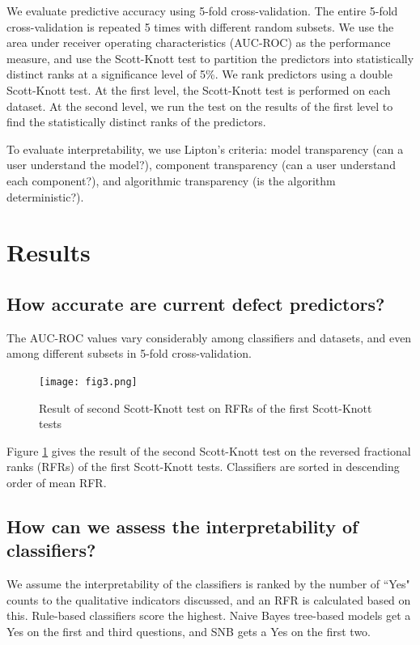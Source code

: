 \documentclass[sigconf]{acmart}
\begin{document}
We evaluate predictive accuracy using 5-fold cross-validation. The entire 5-fold cross-validation is repeated 5 times with different random subsets. We use the area under receiver operating characteristics (AUC-ROC) as the performance measure, and use the Scott-Knott test \cite{jelihovschi2014scottknott} to partition the predictors into statistically distinct ranks at a significance level of 5\%. We rank predictors using a double Scott-Knott test. At the first level, the Scott-Knott test is performed on each dataset. At the second level, we run the test on the results of the first level to find the statistically distinct ranks of the predictors.

To evaluate interpretability, we use Lipton's criteria: model transparency (can a user understand the model?), component transparency (can a user understand each component?), and algorithmic transparency (is the algorithm deterministic?).

\section{Results}

\subsection{How accurate are current defect predictors?}
The AUC-ROC values vary considerably among classifiers and datasets, and even among different subsets in 5-fold cross-validation.

\begin{figure}
\texttt{[image: fig3.png]}
\caption{Result of second Scott-Knott test on RFRs of the first Scott-Knott tests}
\label{fig:3}
\end{figure}

Figure \ref{fig:3} gives the result of the second Scott-Knott test on the reversed fractional ranks (RFRs) of the first Scott-Knott tests. Classifiers are sorted in descending order of mean RFR.

\subsection{How can we assess the interpretability of classifiers?}

We assume the interpretability of the classifiers is ranked by the number of ``Yes" counts to the qualitative indicators discussed, and an RFR is calculated based on this. Rule-based classifiers score the highest. Naive Bayes tree-based models get a Yes on the first and third questions, and SNB gets a Yes on the first two.
\end{document}
